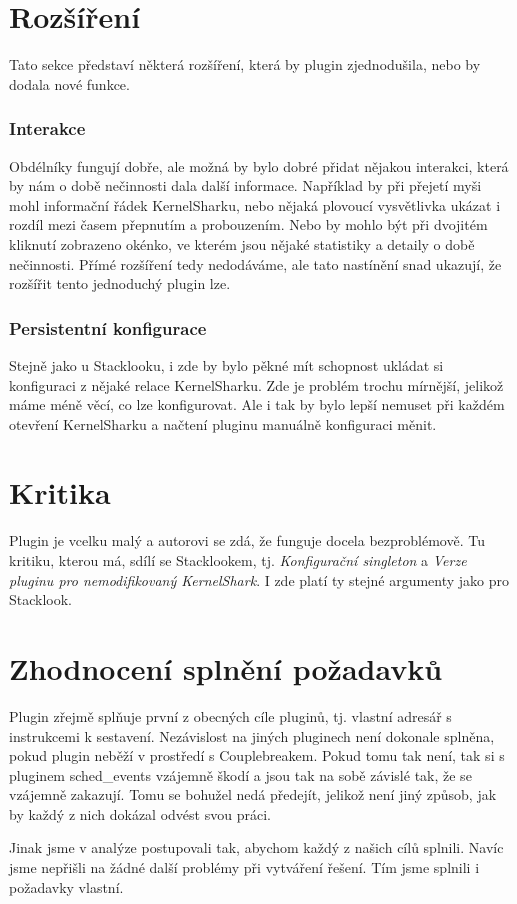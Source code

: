 \section{Rozšíření}
Tato sekce představí některá rozšíření, která by plugin zjednodušila, nebo by dodala nové funkce.

\subsubsection*{Interakce}
Obdélníky fungují dobře, ale možná by bylo dobré přidat nějakou interakci, která by nám o době nečinnosti dala další informace. Například by při přejetí myši mohl informační řádek KernelSharku, nebo nějaká plovoucí vysvětlivka ukázat i rozdíl mezi časem přepnutím a probouzením. Nebo by mohlo být při dvojitém kliknutí zobrazeno okénko, ve kterém jsou nějaké statistiky a detaily o době nečinnosti. Přímé rozšíření tedy nedodáváme, ale tato nastínění snad ukazují, že rozšířit tento jednoduchý plugin lze.

\subsubsection*{Persistentní konfigurace}
Stejně jako u Stacklooku, i zde by bylo pěkné mít schopnost ukládat si konfiguraci z nějaké relace KernelSharku. Zde je problém trochu mírnější, jelikož máme méně věcí, co lze konfigurovat. Ale i tak by bylo lepší nemuset při každém otevření KernelSharku a načtení pluginu manuálně konfiguraci měnit.

\section{Kritika}
Plugin je vcelku malý a autorovi se zdá, že funguje docela bezproblémově. Tu kritiku, kterou má, sdílí se Stacklookem, tj. \emph{Konfigurační singleton} a \emph{Verze pluginu pro nemodifikovaný KernelShark}. I zde platí ty stejné argumenty jako pro Stacklook.

\section{Zhodnocení splnění požadavků}
Plugin zřejmě splňuje první z obecných cíle pluginů, tj. vlastní adresář s instrukcemi k sestavení. Nezávislost na jiných pluginech není dokonale splněna, pokud plugin neběží v prostředí s Couplebreakem. Pokud tomu tak není, tak si s pluginem sched\_events vzájemně škodí a jsou tak na sobě závislé tak, že se vzájemně zakazují. Tomu se bohužel nedá předejít, jelikož není jiný způsob, jak by každý z nich dokázal odvést svou práci.

Jinak jsme v analýze postupovali tak, abychom každý z našich cílů splnili. Navíc jsme nepřišli na žádné další problémy při vytváření řešení. Tím jsme splnili i požadavky vlastní.
